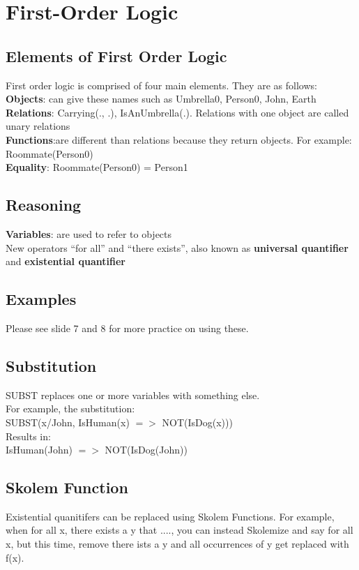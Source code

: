 \documentclass[letterpaper]{article} %
\begin{document}
\section{First-Order Logic}

\subsection{Elements of First Order Logic}

First order logic is comprised of four main elements. They are as follows:\\

\textbf{Objects}: can give these names such as Umbrella0,
Person0, John, Earth\\

\textbf{Relations}: Carrying(., .), IsAnUmbrella(.).
Relations with one object are called unary relations\\

\textbf{Functions}:are different than relations because they return objects. For example: Roommate(Person0)\\

\textbf{Equality}: Roommate(Person0) = Person1

\subsection{Reasoning}

\textbf{Variables}: are used to refer to objects\\

New operators “for all” and “there exists”, also known as \textbf{universal quantifier} and \textbf{existential quantifier}

\subsection{Examples}

Please see slide 7 and 8 for more practice on using these.

\subsection{Substitution}

SUBST replaces one or more variables with something else.\\

For example, the substitution:\\

SUBST({x/John}, IsHuman(x) $=>$ NOT(IsDog(x)))\\

Results in:\\

IsHuman(John) $=>$ NOT(IsDog(John))

\subsection{Skolem Function}

Existential quanitifers can be replaced using Skolem Functions. For example, when for all x, there exists a y that ...., you can instead Skolemize and say for all x, but this time, remove there ists a y and all occurrences of y get replaced with f(x).
\end{document}
